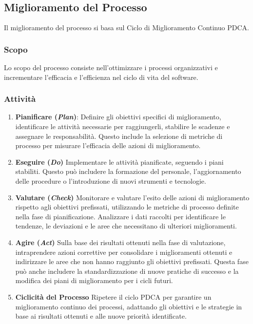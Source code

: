 \subsection{Miglioramento del Processo}

Il miglioramento del processo si basa sul Ciclo di Miglioramento Continuo PDCA.

\subsubsection{Scopo}
Lo scopo del processo consiste nell'ottimizzare i processi organizzativi e
incrementare l'efficacia e l'efficienza nel ciclo di vita del software.

\subsubsection{Attività}
\begin{enumerate}
	\item \textbf{Pianificare (\textit{Plan})}:
	      Definire gli obiettivi specifici di miglioramento, identificare le
	      attività necessarie per raggiungerli, stabilire le scadenze e
	      assegnare le responsabilità. Questo include la selezione di metriche
	      di processo per misurare l'efficacia delle azioni di miglioramento.

	\item \textbf{Eseguire (\textit{Do})}
	      Implementare le attività pianificate, seguendo i piani stabiliti.
	      Questo può includere la formazione del personale, l'aggiornamento
	      delle procedure o l'introduzione di nuovi strumenti e tecnologie.

	\item \textbf{Valutare (\textit{Check})}
	      Monitorare e valutare l'esito delle azioni di miglioramento rispetto
	      agli obiettivi prefissati, utilizzando le metriche di processo
	      definite nella fase di pianificazione. Analizzare i dati raccolti per
	      identificare le tendenze, le deviazioni e le aree che necessitano di
	      ulteriori miglioramenti.
	\item \textbf{Agire (\textit{Act})}
	      Sulla base dei risultati ottenuti nella fase di valutazione,
	      intraprendere azioni correttive per consolidare i miglioramenti
	      ottenuti e indirizzare le aree che non hanno raggiunto gli obiettivi
	      prefissati. Questa fase può anche includere la standardizzazione di
	      nuove pratiche di successo e la modifica dei piani di miglioramento
	      per i cicli futuri.

	\item \textbf{Ciclicità del Processo}
	      Ripetere il ciclo PDCA per garantire un miglioramento continuo dei
	      processi, adattando gli obiettivi e le strategie in base ai risultati
	      ottenuti e alle nuove priorità identificate.
\end{enumerate}
